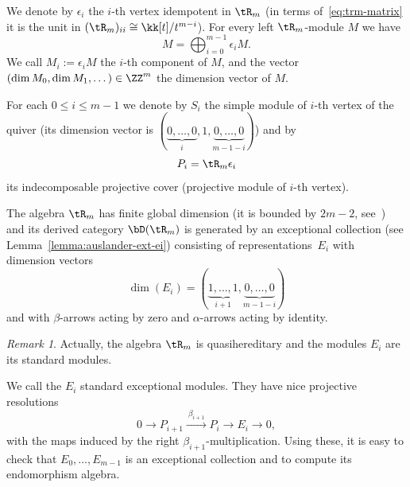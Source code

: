 \documentclass[11pt]{amsart}
\theoremstyle{plain}
\theoremstyle{definition}
\theoremstyle{remark}
\newtheorem{remark}[theorem]{Remark}
\begin{document}
We denote by $\epsilon_i$ the $i$-th vertex idempotent in $\tR_m$ (in terms of~\eqref{eq:trm-matrix} it is the unit in $(\tR_m)_{ii} \cong \kk[t]/t^{m-i}$).
For every left $\tR_m$-module $M$ we have 
\begin{equation*}
M = \bigoplus_{i=0}^{m-1} \epsilon_i M.
\end{equation*}
We call $M_i := \epsilon_i M$ the {\sf $i$-th component} of $M$, and the vector $(\dim M_0,\dim M_1, \dots) \in \ZZ^m$ the {\sf dimension vector} of $M$.

For each $0 \le i \le m-1$ we denote by $S_i$ the {\sf simple module} of $i$-th vertex of the quiver (its dimension vector is $(\underbrace{0, \dots, 0}_{i},1,\underbrace{0,\dots, 0}_{m-1-i})$) and by
\begin{equation*}
P_i = \tR_m \epsilon_i
\end{equation*}
its indecomposable projective cover ({\sf projective module} of $i$-th vertex).


The algebra $\tR_m$ has finite global dimension (it is bounded by $2m - 2$, see~\cite[Proposition~A.14]{kuznetsov2015categorical})
and its derived category $\bD(\tR_m)$ is generated by an exceptional collection (see Lemma~\ref{lemma:auslander-ext-ei})
consisting of representations~$E_i$ with dimension vectors 
\begin{equation*}
\dim(E_i) = (\underbrace{1,\dots,1}_{i+1},\underbrace{0,\dots,0}_{m-1-i})
\end{equation*}
and with $\beta$-arrows acting by zero and $\alpha$-arrows acting by identity.

\begin{remark}
Actually, the algebra $\tR_m$ is quasihereditary and the modules $E_i$ are its standard modules.
\end{remark}

We call the $E_i$ {\sf standard exceptional modules}.
They have nice projective resolutions
\begin{equation}
\label{eq:projective-resolution-ei}
0 \to P_{i+1} \xrightarrow{\ \beta_{i+1}\ } P_i \to E_i \to 0,
\end{equation}
with the maps induced by the right $\beta_{i+1}$-multiplication.
Using these, it is easy to check that $E_0,\dots,E_{m-1}$ is an exceptional collection and to compute its endomorphism algebra.
\end{document}
